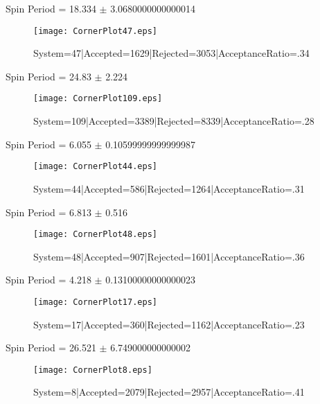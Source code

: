 \documentclass[10pt]{article}
\begin{document}
\begin{center}
        Spin Period = 18.334 $\pm$ 3.0680000000000014
        \end{center}
\begin{figure}[h] 
        \texttt{[image: CornerPlot47.eps]}
        \caption{System=47|Accepted=1629|Rejected=3053|AcceptanceRatio=.34}
        \label{S47}
        \centering
        \end{figure}
\begin{center}
        Spin Period = 24.83 $\pm$ 2.224
        \end{center}
\begin{figure}[h] 
        \texttt{[image: CornerPlot109.eps]}
        \caption{System=109|Accepted=3389|Rejected=8339|AcceptanceRatio=.28}
        \label{S109}
        \centering
        \end{figure}
\begin{center}
        Spin Period = 6.055 $\pm$ 0.10599999999999987
        \end{center}
\begin{figure}[h] 
        \texttt{[image: CornerPlot44.eps]}
        \caption{System=44|Accepted=586|Rejected=1264|AcceptanceRatio=.31}
        \label{S44}
        \centering
        \end{figure}
\begin{center}
        Spin Period = 6.813 $\pm$ 0.516
        \end{center}
\begin{figure}[h] 
        \texttt{[image: CornerPlot48.eps]}
        \caption{System=48|Accepted=907|Rejected=1601|AcceptanceRatio=.36}
        \label{S48}
        \centering
        \end{figure}
\begin{center}
        Spin Period = 4.218 $\pm$ 0.13100000000000023
        \end{center}
\begin{figure}[h] 
        \texttt{[image: CornerPlot17.eps]}
        \caption{System=17|Accepted=360|Rejected=1162|AcceptanceRatio=.23}
        \label{S17}
        \centering
        \end{figure}
\begin{center}
        Spin Period = 26.521 $\pm$ 6.749000000000002
        \end{center}
\begin{figure}[h] 
        \texttt{[image: CornerPlot8.eps]}
        \caption{System=8|Accepted=2079|Rejected=2957|AcceptanceRatio=.41}
        \label{S8}
        \centering
        \end{figure}
\end{document}
